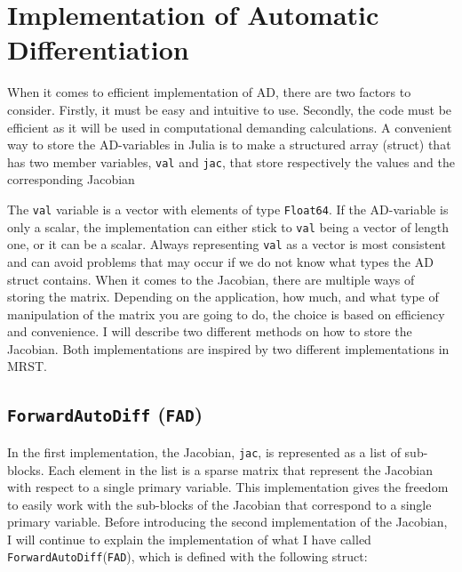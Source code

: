 \section{Implementation of Automatic Differentiation}
\label{sec:ImplementationAD}
When it comes to efficient implementation of AD, there are two factors to consider. Firstly, it must be easy and intuitive to use. Secondly, the code must be efficient as it will be used in computational demanding calculations. A convenient way to store the AD-variables in Julia is to make a structured array (struct) that has two member variables, \texttt{val} and \texttt{jac}, that store respectively the values and the corresponding Jacobian
 
The \texttt{val} variable is a vector with elements of type \texttt{Float64}. If the AD-variable is only a scalar, the implementation can either stick to \texttt{val} being a vector of length one, or it can be a scalar. Always representing \texttt{val} as a vector is most consistent and can avoid problems that may occur if we do not know what types the AD struct contains. When it comes to the Jacobian, there are multiple ways of storing the matrix. Depending on the application, how much, and what type of manipulation of the matrix you are going to do, the choice is based on efficiency and convenience. I will describe two different methods on how to store the Jacobian. Both implementations are inspired by two different implementations in MRST. 

\subsection{\texttt{ForwardAutoDiff} (\texttt{FAD})}
\label{sec:FAD}
In the first implementation, the Jacobian, \texttt{jac}, is represented as a list of sub-blocks. Each element in the list is a sparse matrix that represent the Jacobian with respect to a single primary variable. This implementation gives the freedom to easily work with the sub-blocks of the Jacobian that correspond to a single primary variable. Before introducing the second implementation of the Jacobian, I will continue to explain the implementation of what I have called \texttt{ForwardAutoDiff}(\texttt{FAD}), which is defined with the following struct:


